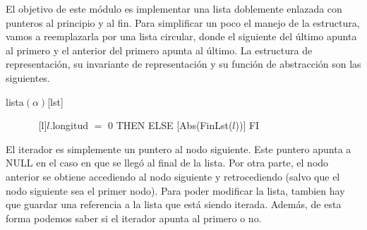 \begin{Representacion}
  
  El objetivo de este módulo es implementar una lista doblemente enlazada con punteros al principio y al fin.  Para simplificar un poco el manejo de la estructura, vamos a reemplazarla por una lista circular, donde el siguiente del último apunta al primero y el anterior del primero apunta al último.  La estructura de representación, su invariante de representación y su función de abstracción son las siguientes.

  \begin{Estructura}{lista$(\alpha)$}[lst]
    \begin{Tupla}[lst]
    \end{Tupla}

    \begin{Tupla}[nodo]
    \end{Tupla}
  \end{Estructura}

  \mbox{}

  ~      
  ~
  ~
  ~
  [l]{\IF $l$.longitud $=$ $0$ THEN \secuencia{} ELSE [Abs(FinLst($l$))] FI}


  El iterador es simplemente un puntero al nodo siguiente.  Este puntero apunta a NULL en el caso en que se llegó al final de la lista.  Por otra parte, el nodo anterior se obtiene accediendo al nodo siguiente y retrocediendo (salvo que el nodo siguiente sea el primer nodo).  Para poder modificar la lista, tambien hay que guardar una referencia a la lista que está siendo iterada.  Además, de esta forma podemos saber si el iterador apunta al primero o no.


\end{Representacion}

